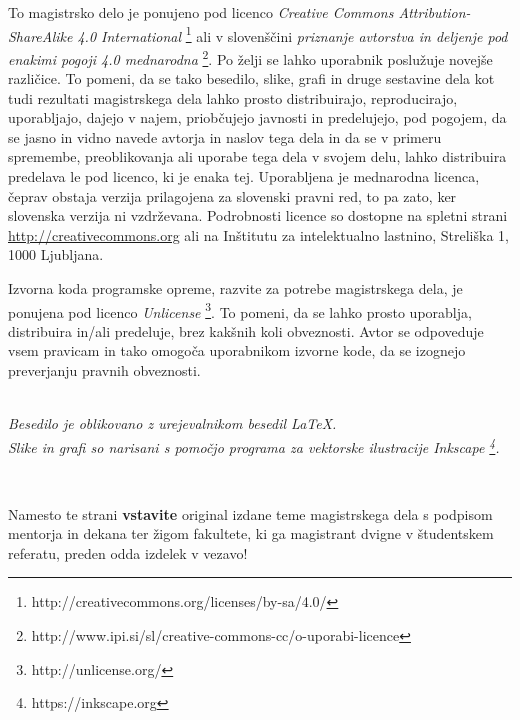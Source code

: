 \documentclass[12pt,a4paper,openany,twoside]{book}
\begin{document}
\vspace*{5cm}
{\small \noindent
To magistrsko delo je ponujeno pod licenco \textit{Creative Commons Attribution-ShareAlike 4.0 International}
\footnote{http://creativecommons.org/licenses/by-sa/4.0/} ali v slovenščini \textit{priznanje avtorstva in deljenje pod enakimi pogoji 4.0 mednarodna}
\footnote{http://www.ipi.si/sl/creative-commons-cc/o-uporabi-licence}. Po želji se lahko uporabnik poslužuje novejše različice.
To pomeni, da se tako besedilo, slike, grafi in druge sestavine dela kot tudi rezultati magistrskega dela lahko prosto distribuirajo,
reproducirajo, uporabljajo, dajejo v najem, priobčujejo javnosti in predelujejo, pod pogojem, da se jasno in vidno navede avtorja in naslov tega
dela in da se v primeru spremembe, preoblikovanja ali uporabe tega dela v svojem delu, lahko distribuira predelava le pod
licenco, ki je enaka tej.
Uporabljena je mednarodna licenca, čeprav obstaja verzija prilagojena za slovenski pravni red, to pa zato, ker slovenska verzija ni vzdrževana.
Podrobnosti licence so dostopne na spletni strani \url{http://creativecommons.org}
ali na Inštitutu za intelektualno lastnino, Streliška 1, 1000 Ljubljana.

\begin{center}%
  \hspace*{1ex}
\end{center}
}

\vspace*{1.5cm}
{\small \noindent
Izvorna koda programske opreme, razvite za potrebe magistrskega dela, je ponujena pod licenco \textit{Unlicense} \footnote{http://unlicense.org/}.
To pomeni, da se lahko prosto uporablja, distribuira in/ali predeluje, brez kakšnih koli obveznosti.
Avtor se odpoveduje vsem pravicam in tako omogoča uporabnikom izvorne kode, da se izognejo preverjanju pravnih obveznosti.
}



\begin{center} 
\ \\ \vfill
{\em Besedilo je oblikovano z urejevalnikom besedil \LaTeX.\\
Slike in grafi so narisani s pomočjo programa za vektorske ilustracije Inkscape \footnote{https://inkscape.org}.}
\end{center}

\newpage
\ \thispagestyle{empty}
\newpage

\thispagestyle{empty}
Namesto te strani {\bf vstavite} original izdane teme magistrskega dela s podpisom mentorja in dekana ter žigom fakultete, ki ga magistrant
dvigne v študent\-skem referatu,  preden odda izdelek v vezavo!
\newpage
\end{document}
